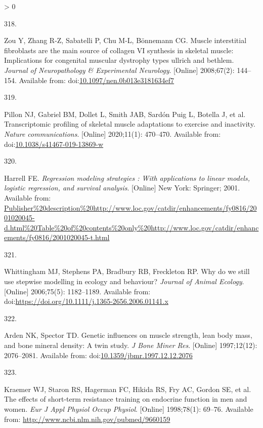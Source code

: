 \documentclass[twoside,10pt]{gihclass} %
\newlength{\cslhangindent}
\newlength{\csllabelwidth}
\newenvironment{CSLReferences}[3] %
 {%
  \setlength{\parindent}{0pt}
  \ifodd #1 \everypar{\setlength{\hangindent}{\cslhangindent}}\ignorespaces\fi
  \ifnum #2 > 0
  \setlength{\parskip}{#2\baselineskip}
  \fi
 }%
 {}
\newcommand{\CSLLeftMargin}[1]{\parbox[t]{\maxof{\widthof{#1}}{\csllabelwidth}}{#1}}
\newcommand{\CSLRightInline}[1]{\parbox[t]{\linewidth}{#1}}
\begin{document}
\begin{CSLReferences}{0}{0}
\leavevmode\hypertarget{ref-RN2883}{}%
\CSLLeftMargin{318. }
\CSLRightInline{Zou Y, Zhang R-Z, Sabatelli P, Chu M-L, Bönnemann CG. Muscle interstitial fibroblasts are the main source of collagen VI synthesis in skeletal muscle: Implications for congenital muscular dystrophy types ullrich and bethlem. \emph{Journal of Neuropathology \& Experimental Neurology}. {[}Online{]} 2008;67(2): 144--154. Available from: doi:\href{https://doi.org/10.1097/nen.0b013e3181634ef7}{10.1097/nen.0b013e3181634ef7}}

\leavevmode\hypertarget{ref-RN2360}{}%
\CSLLeftMargin{319. }
\CSLRightInline{Pillon NJ, Gabriel BM, Dollet L, Smith JAB, Sardón Puig L, Botella J, et al. Transcriptomic profiling of skeletal muscle adaptations to exercise and inactivity. \emph{Nature communications}. {[}Online{]} 2020;11(1): 470--470. Available from: doi:\href{https://doi.org/10.1038/s41467-019-13869-w}{10.1038/s41467-019-13869-w}}

\leavevmode\hypertarget{ref-RN2881}{}%
\CSLLeftMargin{320. }
\CSLRightInline{Harrell FE. \emph{Regression modeling strategies : With applications to linear models, logistic regression, and survival analysis}. {[}Online{]} New York: Springer; 2001. Available from: \url{Publisher\%20description\%20http://www.loc.gov/catdir/enhancements/fy0816/2001020045-d.html\%20Table\%20of\%20contents\%20only\%20http://www.loc.gov/catdir/enhancements/fy0816/2001020045-t.html}}

\leavevmode\hypertarget{ref-RN2882}{}%
\CSLLeftMargin{321. }
\CSLRightInline{Whittingham MJ, Stephens PA, Bradbury RB, Freckleton RP. Why do we still use stepwise modelling in ecology and behaviour? \emph{Journal of Animal Ecology}. {[}Online{]} 2006;75(5): 1182--1189. Available from: doi:\url{https://doi.org/10.1111/j.1365-2656.2006.01141.x}}

\leavevmode\hypertarget{ref-RN2884}{}%
\CSLLeftMargin{322. }
\CSLRightInline{Arden NK, Spector TD. Genetic influences on muscle strength, lean body mass, and bone mineral density: A twin study. \emph{J Bone Miner Res}. {[}Online{]} 1997;12(12): 2076--2081. Available from: doi:\href{https://doi.org/10.1359/jbmr.1997.12.12.2076}{10.1359/jbmr.1997.12.12.2076}}

\leavevmode\hypertarget{ref-RN166}{}%
\CSLLeftMargin{323. }
\CSLRightInline{Kraemer WJ, Staron RS, Hagerman FC, Hikida RS, Fry AC, Gordon SE, et al. The effects of short-term resistance training on endocrine function in men and women. \emph{Eur J Appl Physiol Occup Physiol}. {[}Online{]} 1998;78(1): 69--76. Available from: \url{http://www.ncbi.nlm.nih.gov/pubmed/9660159}}


\end{CSLReferences}
\end{document}
